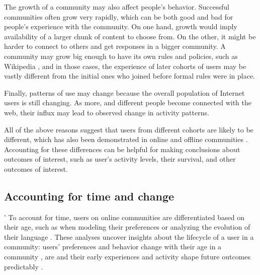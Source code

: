 The growth of a community may also affect people's behavior. Successful communities often grow very rapidly, which can be both good and bad for people's experience with the community. On one hand, growth would imply availability of a larger chunk of content to choose from. On the other, it might be harder to connect to others and get responses in a bigger community. A community may grow big enough to have its own rules and policies, such as Wikipedia \cite{}, and in those cases, the experience of later cohorts of users may be vastly different from the initial ones who joined before formal rules were in place. 

Finally, patterns of use may change because the overall population of Internet users is still changing. As more, and different people become connected with the web, their influx may lead to observed change in activity patterns. 

  


All of the above reasons suggest that users from different cohorts are likely to be different, which has also been demonstrated in online and offline communities \cite{danescu,others}. Accounting for these differences can be helpful for making conclusions about outcomes of interest, such as user's activity levels, their survival, and other outcomes of interest.

\subsection{Accounting for time and change}'
To account for time, users on online communities are differentiated based on their age, such as when modeling their preferences \cite{McAuley2013} or analyzing the evolution of their language \cite{danescu}. These analyses uncover insights about the lifecycle of a user in a community: users' preferences and behavior change with their age in a community \cite{panciera2010}, are and their early experiences and activity shape future outcomes predictably \cite{Tan2015,Yang2010,Panciera2009, Miller2015}. 

